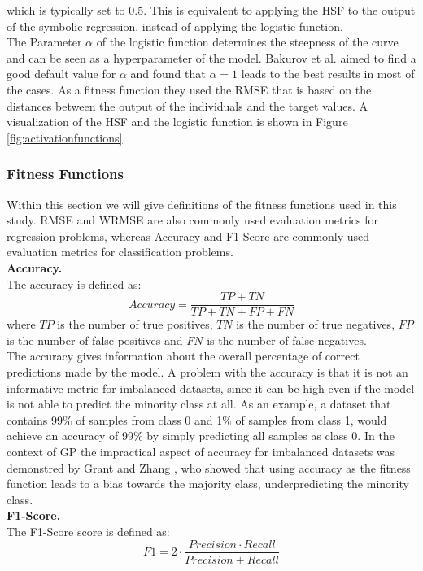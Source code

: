\documentclass[manuscript, review, anonymous]{acmart} %
\begin{document}
which is typically set to 0.5. This is equivalent to
applying the HSF to the output of the symbolic regression,
instead of applying the logistic function.\\
The Parameter \(\alpha\) of the logistic function determines the steepness
of the curve and can be seen as a hyperparameter
of the model.
Bakurov et al. \cite{Bakurov2019} aimed to find a good default
value for \(\alpha\) and found that \(\alpha = 1\) leads
to the best results in most of the cases.
As a fitness function they used the RMSE that is
based on the distances between the output of the individuals
and the target values.
A visualization of the HSF and the logistic function is
shown in Figure \ref{fig:activationfunctions}.\\

\subsubsection{Fitness Functions}
\label{sec:fitnessfunctions}
Within this section we will give definitions of the fitness functions used in this study.
RMSE and WRMSE are also commonly used evaluation metrics for regression problems, whereas
Accuracy and F1-Score are commonly used evaluation metrics for classification problems.\\
\textbf{Accuracy.}\\
The accuracy is defined as:
\[
Accuracy = \frac{TP + TN}{TP + TN + FP +
FN}\]
where \(TP\) is the number of true positives, \(TN\) is the number of true negatives, \(FP\) is the number of false positives and \(FN\) is the number of false negatives.\\
The accuracy gives information about the overall percentage of correct
predictions made by the model.
A problem with the accuracy is that it is not
an informative metric for imbalanced datasets,
since it can be high even if the model is
not able to predict the minority class at all.
As an example, a dataset that contains 99\% of samples
from class 0 and 1\% of samples from class 1,
would achieve
an accuracy of 99\% by simply predicting all samples as
class 0.
In the context of GP the impractical aspect of accuracy
for imbalanced datasets was demonstred by Grant and Zhang \cite{grant2007},
who showed that using accuracy as the fitness function leads to a bias towards the majority class, underpredicting the minority class.\\
\textbf{F1-Score.}\\
The F1-Score score is defined as:
\[
F1 = 2 \cdot \frac{Precision \cdot Recall}{Precision + Recall}\]
\end{document}
